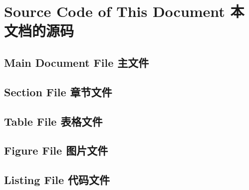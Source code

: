 \section{Source Code of This Document 本文档的源码}

\subsection{Main Document File 主文件}



\subsection{Section File 章节文件}




\subsection{Table File 表格文件}


\subsection{Figure File 图片文件}
 
 

 

\subsection{Listing File 代码文件}
 
 
 
 
 
 
 
